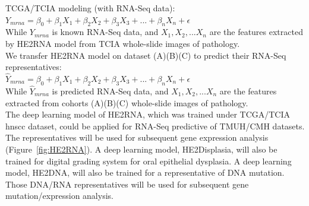 \documentclass[12pt, a4paper]{article}
\begin{document}





TCGA/TCIA modeling (with RNA-Seq data):\\[0.2cm]
$Y_{mrna} = \beta_0 + \beta_1 X_1 + \beta_2 X_2 + \beta_3 X_3 + ... + \beta_n X_n + \epsilon$\\[0.3cm]
While 
$Y_{mrna}$ is known RNA-Seq data, and
$X_1, X_2, ...X_n$ are the features extracted by HE2RNA model from TCIA whole-slide images of pathology.\\[0.5cm]

We transfer HE2RNA model on dataset (A)(B)(C) to predict their RNA-Seq representatives:\\[0.2cm]
$\hat{Y}_{mrna} = \beta_0 + \beta_1 X_1 + \beta_2 X_2 + \beta_3 X_3 + ... + \beta_n X_n + \epsilon$\\[0.3cm]
While $\hat{Y}_{mrna}$ is predicted RNA-Seq data, and
$X_1, X_2, ...X_n$ are the features extracted from cohorts (A)(B)(C) whole-slide images of pathology.\\
The deep learning model of HE2RNA, which was trained under TCGA/TCIA \acrshort{hnscc} dataset, could be applied for RNA-Seq predictive of TMUH/CMH datasets. 
The representatives will be used for subsequent gene expression analysis (Figure~\ref{fig:HE2RNA}).
A deep learning model, HE2Displasia, will also be trained for digital grading system for oral epithelial dysplasia.
A deep learning model, HE2DNA, will also be trained for a representative of DNA mutation.
Those DNA/RNA representatives will be used for subsequent gene mutation/expression analysis.
\end{document}
